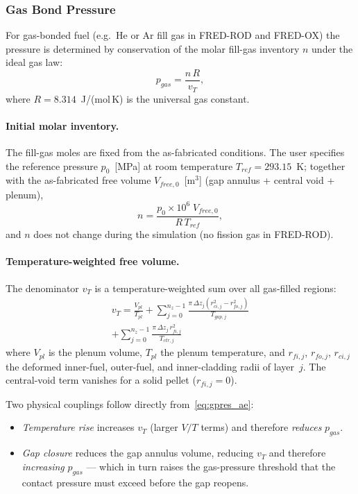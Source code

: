 \begin{refsection}
\subsubsection{Gas Bond Pressure}
\label{sec:gas_bond_pressure}

For gas-bonded fuel (e.g.\ He or Ar fill gas in FRED-ROD and FRED-OX) the pressure is determined by conservation of the molar fill-gas inventory $n$ under the ideal gas law:
\begin{equation}
  p_{gas} = \frac{n\,R}{v_T},
  \label{eq:gpres_ae}
\end{equation}
where $R = 8.314$~J/(mol\,K) is the universal gas constant.

\paragraph{Initial molar inventory.} The fill-gas moles are fixed from the as-fabricated conditions.  The user specifies the reference pressure $p_0$~[MPa] at room temperature $T_{ref} = 293.15$~K; together with the as-fabricated free volume $V_{free,0}$~[m$^3$] (gap annulus + central void + plenum),
\begin{equation}
  n = \frac{p_0 \times 10^6\; V_{free,0}}{R\,T_{ref}},
  \label{eq:mu0}
\end{equation}
and $n$ does not change during the simulation (no fission gas in FRED-ROD).

\paragraph{Temperature-weighted free volume.} The denominator $v_T$ is a temperature-weighted sum over all gas-filled regions:
\begin{multline}
  v_T = \frac{V_{pl}}{T_{pl}}
        + \sum_{j=0}^{n_z-1}
          \frac{\pi\,\Delta z_j\left(r_{ci,j}^2 - r_{fo,j}^2\right)}{T_{gap,j}} \\
        + \sum_{j=0}^{n_z-1}
          \frac{\pi\,\Delta z_j\,r_{fi,j}^2}{T_{ctr,j}}
  \label{eq:vT}
\end{multline}
where $V_{pl}$ is the plenum volume, $T_{pl}$ the plenum temperature, and $r_{fi,j}$, $r_{fo,j}$, $r_{ci,j}$ the deformed inner-fuel, outer-fuel, and inner-cladding radii of layer~$j$.  The central-void term vanishes for a solid pellet ($r_{fi,j} = 0$).

Two physical couplings follow directly from~\eqref{eq:gpres_ae}:
\begin{itemize}
\item \emph{Temperature rise} increases $v_T$ (larger $V/T$ terms) and therefore \emph{reduces} $p_{gas}$.
\item \emph{Gap closure} reduces the gap annulus volume, reducing $v_T$ and therefore \emph{increasing} $p_{gas}$ — which in turn raises the gas-pressure threshold that the contact pressure must exceed before the gap reopens.
\end{itemize}


\end{refsection}
